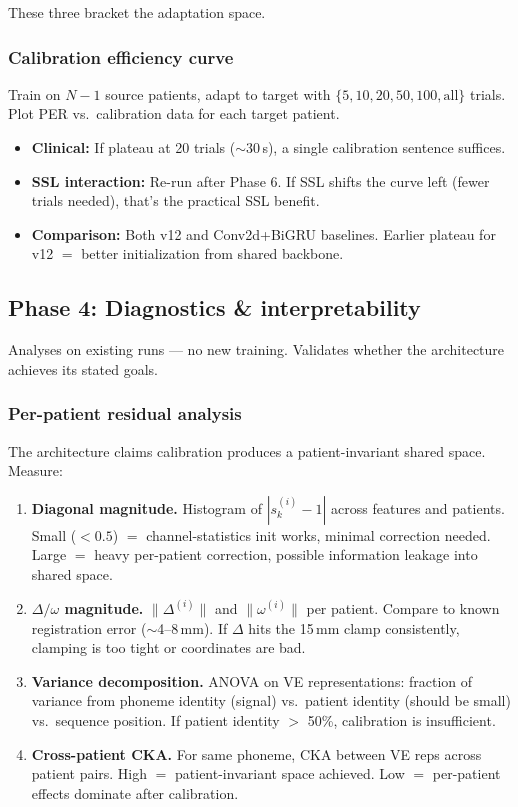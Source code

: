 \documentclass[11pt,letterpaper]{article}
\begin{document}
These three bracket the adaptation space.

\subsubsection{Calibration efficiency curve}

Train on $N{-}1$ source patients, adapt to target with $\{5, 10, 20, 50, 100, \text{all}\}$ trials. Plot PER vs.\ calibration data for each target patient.

\begin{itemize}[leftmargin=2em]
\item \textbf{Clinical:} If plateau at 20 trials (${\sim}$30\,s), a single calibration sentence suffices.
\item \textbf{SSL interaction:} Re-run after Phase 6. If SSL shifts the curve left (fewer trials needed), that's the practical SSL benefit.
\item \textbf{Comparison:} Both v12 and Conv2d+BiGRU baselines. Earlier plateau for v12 $=$ better initialization from shared backbone.
\end{itemize}

\subsection{Phase 4: Diagnostics \& interpretability}\label{sec:phase4}

Analyses on existing runs --- no new training. Validates whether the architecture achieves its stated goals.

\subsubsection{Per-patient residual analysis}

The architecture claims calibration produces a patient-invariant shared space. Measure:

\begin{enumerate}[leftmargin=2em]
\item \textbf{Diagonal magnitude.} Histogram of $|s^{(i)}_k - 1|$ across features and patients. Small ($< 0.5$) $=$ channel-statistics init works, minimal correction needed. Large $=$ heavy per-patient correction, possible information leakage into shared space.
\item \textbf{$\Delta/\omega$ magnitude.} $\|\Delta^{(i)}\|$ and $\|\omega^{(i)}\|$ per patient. Compare to known registration error (${\sim}$4--8\,mm). If $\Delta$ hits the 15\,mm clamp consistently, clamping is too tight or coordinates are bad.
\item \textbf{Variance decomposition.} ANOVA on VE representations: fraction of variance from phoneme identity (signal) vs.\ patient identity (should be small) vs.\ sequence position. If patient identity $>$ 50\%, calibration is insufficient.
\item \textbf{Cross-patient CKA.} For same phoneme, CKA between VE reps across patient pairs. High $=$ patient-invariant space achieved. Low $=$ per-patient effects dominate after calibration.
\end{enumerate}
\end{document}
